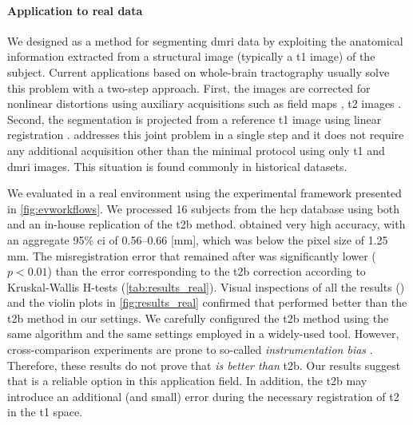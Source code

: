 \paragraph*{Application to real data}
We designed \regseg{} as a method for segmenting \gls*{dmri} data by exploiting the
  anatomical information extracted from a structural image (typically a \gls*{t1} image)
  of the subject.
Current applications based on whole-brain tractography usually solve this problem with a two-step approach.
First, the images are corrected for nonlinear distortions using auxiliary acquisitions
  such as field maps \citep{jezzard_correction_1995}, \gls*{t2} images \citep{kybic_unwarping_2000}.
Second, the segmentation is projected from a reference \gls*{t1} image using linear
  registration \citep{greve_accurate_2009}.
\Regseg{} addresses this joint problem in a single step and it does not require any additional
  acquisition other than the minimal protocol using only \gls*{t1} and \gls*{dmri} images.
This situation is found commonly in historical datasets.

We evaluated \regseg{} in a real environment using the experimental framework presented
  in \autoref{fig:evworkflows}.
We processed 16 subjects from the \gls*{hcp} database using both \regseg{}
  and an in-house replication of the \acrfull*{t2b} method.
\Regseg{} obtained very high accuracy, with an aggregate 95\% \gls*{ci} of 0.56--0.66 [mm], which was
  below the pixel size of 1.25 mm.
The misregistration error that remained after \regseg{} was significantly lower ($p < 0.01$) than the
  error corresponding to the \gls*{t2b} correction according to Kruskal-Wallis H-tests
  (\autoref{tab:results_real}).
Visual inspections of all the results () and the violin plots in
  \autoref{fig:results_real} confirmed that \regseg{} performed better than the \gls*{t2b} method
  in our settings.
We carefully configured the \gls*{t2b} method using the same algorithm and the
  same settings employed in a widely-used tool.
However, cross-comparison experiments are prone to so-called \emph{instrumentation bias}
  \citep{tustison_instrumentation_2013}.
Therefore, these results do not prove that \regseg{} \emph{is better than} \gls*{t2b}.
Our results suggest that \regseg{} is a reliable option in this application field.
In addition, the \gls*{t2b} may introduce an additional (and small) error during the necessary
  registration of \gls*{t2} in the \gls*{t1} space.

